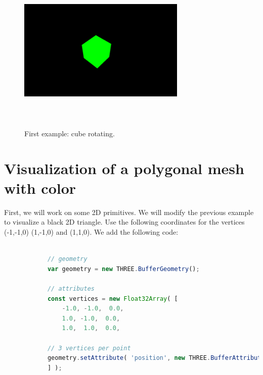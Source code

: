 \documentclass{article}
\begin{document}
\begin{figure}[H]
    \centering
    \includegraphics[width=8cm, height=8cm]{example1.png}
    \caption{First example: cube rotating.}
    \label{fig:firstcube}
\end{figure}

\section{Visualization of a polygonal mesh with color}

First, we will work on some 2D primitives. We will modify the previous example to visualize a black 2D triangle. Use the following coordinates for the vertices (-1,-1,0) (1,-1,0) and (1,1,0). We add the following code:

\begin{lstlisting}[language=JavaScript, caption=2D Primitives.]

			// geometry
            var geometry = new THREE.BufferGeometry();

            // attributes
            const vertices = new Float32Array( [
                -1.0, -1.0,  0.0,
                1.0, -1.0,  0.0,
                1.0,  1.0,  0.0,

            // 3 vertices per point
            geometry.setAttribute( 'position', new THREE.BufferAttribute( vertices, 3 ) );
            ] );

\end{lstlisting}
\end{document}

